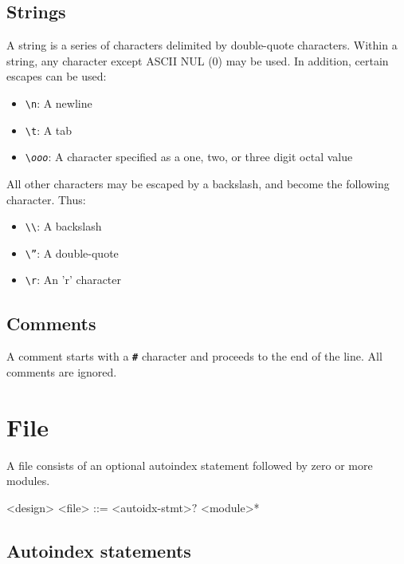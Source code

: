 \subsection{Strings}

A string is a series of characters delimited by double-quote characters. Within a string, any character except ASCII NUL (0) may be used. In addition, certain escapes can be used:

\begin{itemize}
    \item \texttt{\textbackslash n}: A newline
    \item \texttt{\textbackslash t}: A tab
    \item \texttt{\textbackslash \textit{ooo}}: A character specified as a one, two, or three digit octal value
\end{itemize}

All other characters may be escaped by a backslash, and become the following character. Thus:

\begin{itemize}
    \item \texttt{\textbackslash \textbackslash}: A backslash
    \item \texttt{\textbackslash ''}: A double-quote
    \item \texttt{\textbackslash r}: An 'r' character
\end{itemize}

\subsection{Comments}

A comment starts with a \texttt{\textbf{\#}} character and proceeds to the end of the line. All comments are ignored.

\section{File}

A file consists of an optional autoindex statement followed by zero or more modules.

\begin{indentgrammar}{<design>}
<file> ::= <autoidx-stmt>$?$ <module>*
\end{indentgrammar}

\subsection{Autoindex statements}

